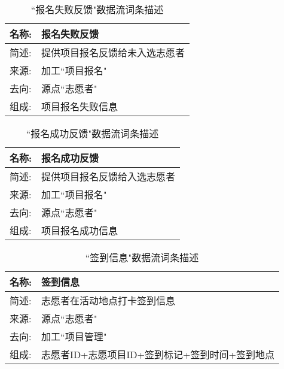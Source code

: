 
    
    

    
    
    
   
    
    \begin{table}[H]  
    \caption{``报名失败反馈"数据流词条描述}  
    \begin{center}  
        \begin{tabular}{l p{11cm}} 
            \hline
            \quad 名称: & 报名失败反馈 \\
            \hline
            \quad 简述: & 提供项目报名反馈给未入选志愿者 \\
            \hline
            \quad 来源: & 加工``项目报名" \\
            \hline
            \quad 去向: & 源点``志愿者" \\
            \hline
            \quad 组成: & 项目报名失败信息  \\
            \hline
        \end{tabular}
        \label{tab1}
    \end{center}
    \end{table}

    \begin{table}[H]  
    \caption{``报名成功反馈"数据流词条描述}  
    \begin{center}  
        \begin{tabular}{l p{11cm}} 
            \hline
            \quad 名称: & 报名成功反馈 \\
            \hline
            \quad 简述: & 提供项目报名反馈给入选志愿者 \\
            \hline
            \quad 来源: & 加工``项目报名" \\
            \hline
            \quad 去向: & 源点``志愿者" \\
            \hline
            \quad 组成: & 项目报名成功信息  \\
            \hline
        \end{tabular}
        \label{tab1}
    \end{center}
    \end{table}
    
    \begin{table}[H]  
    \caption{``签到信息"数据流词条描述}  
    \begin{center}  
        \begin{tabular}{l p{11cm}} 
            \hline
            \quad 名称: & 签到信息 \\
            \hline
            \quad 简述: & 志愿者在活动地点打卡签到信息 \\
            \hline
            \quad 来源: & 源点``志愿者" \\
            \hline
            \quad 去向: & 加工``项目管理"\\
            \hline
            \quad 组成: & 志愿者ID+志愿项目ID+签到标记+签到时间+签到地点  \\
            \hline
        \end{tabular}
        \label{tab1}
    \end{center}
    \end{table}

